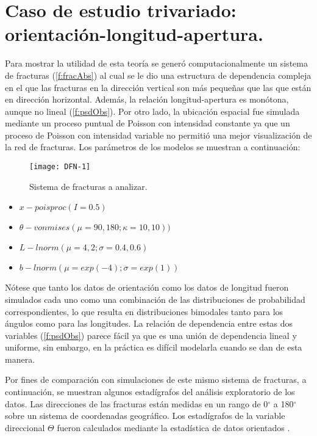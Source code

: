 \section{Caso de estudio trivariado:  orientaci\'on-longitud-apertura.}
\label{s:caseStudy3D}

Para mostrar la utilidad de esta teor\'ia se gener\'o computacionalmente un sistema de fracturas (\autoref{f:fracAbs}) al cual se le dio una estructura de dependencia compleja en el que las fracturas en la direcci\'on vertical son m\'as peque\~nas que las que est\'an en direcci\'on horizontal. Adem\'as, la relaci\'on longitud-apertura es mon\'otona, aunque no lineal (\autoref{f:psdObs}). Por otro lado, la ubicaci\'on espacial fue simulada mediante un proceso puntual de Poisson con intensidad constante ya que un proceso de Poisson con intensidad variable no permiti\'o una mejor visualizaci\'on de la red de fracturas. Los par\'ametros de los modelos se muestran a continuaci\'on:

\begin{figure}[H]
\centering
\texttt{[image: DFN-1]}
\caption{Sistema de fracturas a analizar.}
\label{f:fracAbs} %
\end{figure}

\begin{itemize}
  \item $x - poisproc(I = 0.5)$
  	\item $\theta - vonmises(\mu = 90, 180; \kappa = 10, 10))$
  \item $L - lnorm(\mu = 4, 2; \sigma = 0.4, 0.6)$
    \item $b - lnorm(\mu = exp(-4); \sigma = exp(1))$
\end{itemize}

N\'otese que tanto los datos de orientaci\'on como los datos de longitud fueron simulados cada uno como una combinaci\'on de las distribuciones de probabilidad correspondientes, lo que resulta en distribuciones bimodales tanto para los \'angulos como para las longitudes. La relaci\'on de dependencia entre estas dos variables (\autoref{f:psdObs}) parece f\'acil ya que es una uni\'on de dependencia lineal y uniforme, sin embargo, en la pr\'actica es dif\'icil modelarla cuando se dan de esta manera.

Por fines de comparaci\'on con simulaciones de este mismo sistema de fracturas, a continuaci\'on, se muestran algunos estad\'igrafos del an\'alisis exploratorio de los datos. Las direcciones de las fracturas est\'an medidas en un rango de 0$^\circ$ a 180$^\circ$ sobre un sistema de coordenadas geogr\'afico. Los estad\'igrafos de la variable direccional $\Theta$ fueron calculados mediante la estad\'istica de datos orientados \citep{mardia_directional_2000,fisher_statistical_1995,jammalamadaka_topics_2001}.

